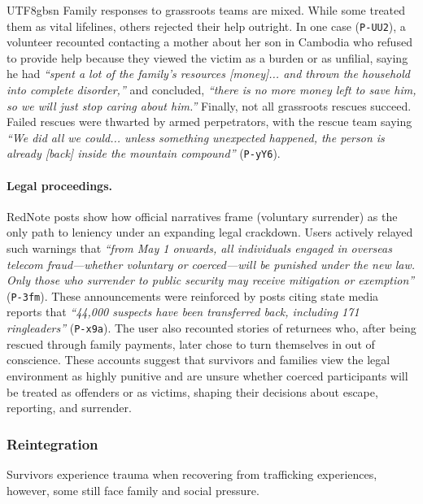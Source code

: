 \documentclass[sigconf,nonacm]{acmart}
\newcommand{\add}[1]{#1}
\begin{document}
\begin{CJK}{UTF8}{gbsn}
Family responses to grassroots teams are mixed. While some treated them as vital lifelines, others rejected their help outright. In one case (\texttt{P-UU2}), a volunteer recounted contacting a mother about her son in Cambodia who refused to provide help because they viewed the victim as a burden or as unfilial, saying he had \textit{``spent a lot of the family's resources [money]... and thrown the household into complete disorder,''} and concluded, \textit{``there is no more money left to save him, so we will just stop caring about him.''} Finally, not all grassroots rescues succeed. Failed rescues were thwarted by armed perpetrators, with the rescue team saying  \textit{``We did all we could... unless something unexpected happened, the person is already [back] inside the mountain compound''} (\texttt{P-yY6}).

\paragraph{\textbf{Legal proceedings.}} RedNote posts show how official narratives frame (voluntary surrender) as the only path to leniency under an expanding legal crackdown. Users actively relayed such warnings that \textit{``from May 1 onwards, all individuals engaged in overseas telecom fraud---whether voluntary or coerced---will be punished under the new law. Only those who surrender to public security may receive mitigation or exemption''} (\texttt{P-3fm}). These announcements were reinforced by posts citing state media reports that \textit{``44,000 suspects have been transferred back, including 171 ringleaders''} (\texttt{P-x9a}). The user also recounted stories of returnees who, after being rescued through family payments, later chose to turn themselves in out of conscience. \add{These accounts suggest that survivors and families view the legal environment as highly punitive and are unsure whether coerced participants will be treated as offenders or as victims, shaping their decisions about escape, reporting, and surrender.}

\subsubsection{Reintegration}
\label{sec:reintegration}

Survivors experience trauma when recovering from trafficking experiences, however, some still face family and social pressure.


\end{CJK}
\end{document}
